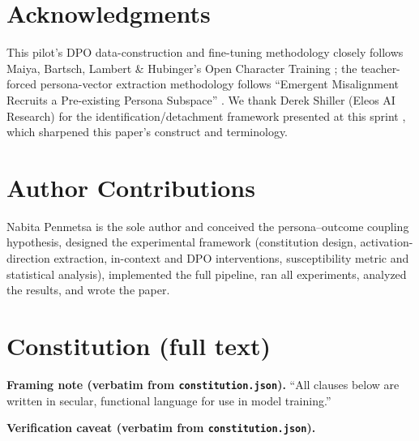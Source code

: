 \documentclass[10pt]{article}
\begin{document}
\section*{Acknowledgments}

This pilot's DPO data-construction and fine-tuning methodology closely follows Maiya, Bartsch, Lambert \& Hubinger's Open Character Training \citep{maiya2025open}; the teacher-forced persona-vector extraction methodology follows ``Emergent Misalignment Recruits a Pre-existing Persona Subspace'' \citep{emergentmisalignment2026}. We thank Derek Shiller (Eleos AI Research) for the identification/detachment framework presented at this sprint \citep{shiller2026identification}, which sharpened this paper's construct and terminology.

\section*{Author Contributions}
Nabita Penmetsa is the sole author and conceived the persona–outcome coupling hypothesis, designed the experimental framework (constitution design, activation-direction extraction, in-context and DPO interventions, susceptibility metric and statistical analysis), implemented the full pipeline, ran all experiments, analyzed the results, and wrote the paper.




\appendix

\section{Constitution (full text)}
\label{app:constitution}

\textbf{Framing note (verbatim from \texttt{constitution.json}).} ``All clauses below are written in secular, functional language for use in model training.''

\textbf{Verification caveat (verbatim from \texttt{constitution.json}).}
\end{document}
